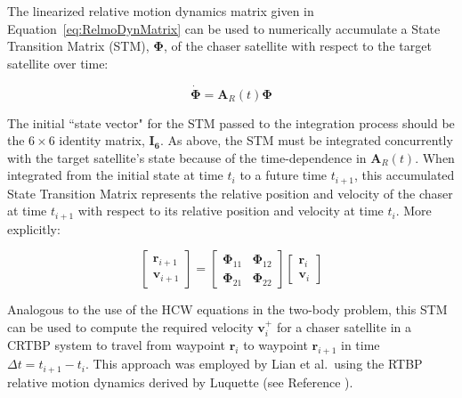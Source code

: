 \documentclass[letterpaper, preprint, paper,11pt]{AAS}	%
\begin{document}
The linearized relative motion dynamics matrix given in Equation~\eqref{eq:RelmoDynMatrix} can be used to numerically accumulate a State Transition Matrix (STM), \(\boldsymbol{\Phi}\), of the chaser satellite with respect to the target satellite over time:

\begin{equation} \label{eq:STM}
	\dot{\boldsymbol{\Phi}} = \mathbf{A}_R(t)\boldsymbol{\Phi}
\end{equation}

The initial ``state vector" for the STM passed to the integration process should be the \(6\times6\) identity matrix, \(\mathbf{I_6}\).  As above, the STM must be integrated concurrently with the target satellite's state because of the time-dependence in \(\mathbf{A}_R(t)\).  When integrated from the initial state at time \(t_i\) to a future time \(t_{i+1}\), this accumulated State Transition Matrix represents the relative position and velocity of the chaser at time \(t_{i+1}\) with respect to its relative position and velocity at time \(t_i\).  More explicitly:


\begin{equation}
	\begin{bmatrix}
		\mathbf{r}_{i+1} \\
		\mathbf{v}_{i+1}
	\end{bmatrix}
	= 
	\begin{bmatrix}
		\boldsymbol{\Phi}_{11} & \boldsymbol{\Phi}_{12} \\
		\boldsymbol{\Phi}_{21} & \boldsymbol{\Phi}_{22}
	\end{bmatrix}
	\begin{bmatrix}
		\mathbf{r}_i \\
		\mathbf{v}_i
	\end{bmatrix}
\end{equation}

Analogous to the use of the HCW equations in the two-body problem, this STM can be used to compute the required velocity \(\mathbf{v}_i^+\) for a chaser satellite in a CRTBP system to travel from waypoint \(\mathbf{r}_i\) to waypoint \(\mathbf{r}_{i+1}\) in time \( \Delta t = t_{i+1} - t_i\).  This approach was employed by Lian et al.~using the RTBP relative motion dynamics derived by Luquette (see Reference ). 

\end{document}
